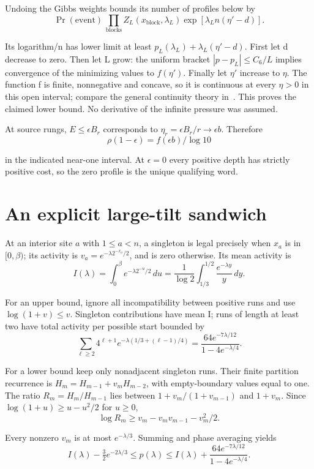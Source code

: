 \documentclass[11pt,letterpaper]{article}
\begin{document}
Undoing the Gibbs weights bounds its number of profiles below by
\[
\Pr(\text{event})\,
 \prod_{\text{blocks}}Z_L(x_{\text{block}},\lambda_L)
 \exp[\lambda_L n(\eta'-d)].
\]

Its logarithm/n has lower limit at least $p_L(\lambda_L)+\lambda_L(\eta'-d)$. First let d decrease to zero. Then let L grow: the uniform bracket $|p-p_L|\le C_6/L$ implies convergence of the minimizing values to $f(\eta')$. Finally let $\eta'$ increase to $\eta$. The function f is finite, nonnegative and concave, so it is continuous at every $\eta>0$ in this open interval; compare the general continuity theory in~\cite{rockafellar}. This proves the claimed lower bound. No derivative of the infinite pressure was assumed.

At source rungs, $E\le\epsilon B_r$ corresponds to $\eta_r=\epsilon B_r/r\to\epsilon b$. Therefore
\[
\rho(1-\epsilon)=f(\epsilon b)/\log10
\]

in the indicated near-one interval. At $\epsilon=0$ every positive depth has strictly positive cost, so the zero profile is the unique qualifying word.

\section{An explicit large-tilt sandwich}

At an interior site $a$ with $1\le a<n$, a singleton is legal precisely when $x_a$ is in $[0,\beta)$; its activity is $v_a=e^{-\lambda 2^{-x_a}/2}$, and is zero otherwise. Its mean activity is
\[
I(\lambda)=\int_0^\beta e^{-\lambda 2^{-u}/2}\,du
 =\frac1{\log2}\int_{1/3}^{1/2}\frac{e^{-\lambda y}}y\,dy.
\]

For an upper bound, ignore all incompatibility between positive runs and use $\log(1+v)\le v$. Singleton contributions have mean I; runs of length at least two have total activity per possible start bounded by
\[
\sum_{\ell\ge2}4^{\ell+1}
 e^{-\lambda(1/3+(\ell-1)/4)}
 =\frac{64e^{-7\lambda/12}}{1-4e^{-\lambda/4}}.
\]

For a lower bound keep only nonadjacent singleton runs. Their finite partition recurrence is $H_m=H_{m-1}+v_mH_{m-2}$, with empty-boundary values equal to one. The ratio $R_m=H_m/H_{m-1}$ lies between $1+v_m/(1+v_{m-1})$ and $1+v_m$. Since $\log(1+u)\ge u-u^2/2$ for $u\ge0$,
\[
\log R_m\ge v_m-v_mv_{m-1}-v_m^2/2.
\]

Every nonzero $v_m$ is at most $e^{-\lambda/3}$. Summing and phase averaging yields
\[
I(\lambda)-\tfrac32e^{-2\lambda/3}
\le p(\lambda)
\le I(\lambda)+\frac{64e^{-7\lambda/12}}{1-4e^{-\lambda/4}}.
\]
\end{document}
